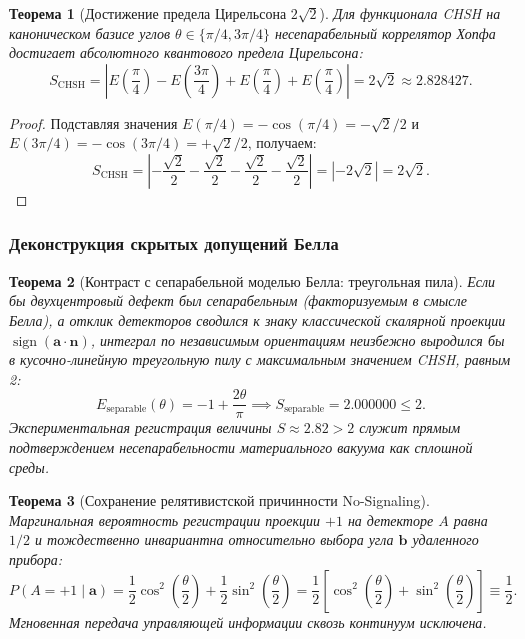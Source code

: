 \documentclass[11pt,a4paper]{article}
\newtheorem{theorem}{Теорема}
\theoremstyle{definition}
\theoremstyle{remark}
\begin{document}
\begin{theorem}[Достижение предела Цирельсона $2\sqrt{2}$]\cite{Tsirelson1980}
\label{thm:tsirelson_bound_exact_proof}
Для функционала CHSH на каноническом базисе углов $\theta \in \{\pi/4, 3\pi/4\}$ несепарабельный коррелятор Хопфа достигает абсолютного квантового предела Цирельсона:
\begin{equation}
S_{\mathrm{CHSH}} = \left| E\left(\frac{\pi}{4}\right) - E\left(\frac{3\pi}{4}\right) + E\left(\frac{\pi}{4}\right) + E\left(\frac{\pi}{4}\right) \right| = 2\sqrt{2} \approx 2.828427.
\label{eq:tsirelson_bound_exact_value}
\end{equation}
\end{theorem}
\begin{proof}
    Подставляя значения $E(\pi/4) = -\cos(\pi/4) = -\sqrt{2}/2$ и $E(3\pi/4) = -\cos(3\pi/4) = +\sqrt{2}/2$, получаем:
\begin{equation}
     S_{\mathrm{CHSH}} = \left| -\frac{\sqrt{2}}{2} - \frac{\sqrt{2}}{2} - \frac{\sqrt{2}}{2} - \frac{\sqrt{2}}{2} \right| = |-2\sqrt{2}| = 2\sqrt{2}.
\end{equation}
\end{proof}

\subsubsection{Деконструкция скрытых допущений Белла}

\begin{theorem}[Контраст с сепарабельной моделью Белла: треугольная пила]
\label{thm:classical_bell_comparison}
    Если бы двухцентровый дефект был сепарабельным (факторизуемым в смысле Белла), а отклик детекторов сводился к знаку классической скалярной проекции $\operatorname{sign}(\mathbf{a} \cdot \mathbf{n})$, интеграл по независимым ориентациям неизбежно выродился бы в кусочно-линейную треугольную пилу с максимальным значением CHSH, равным 2:
\begin{equation}
    E_{\mathrm{separable}}(\theta) = -1 + \frac{2\theta}{\pi} \implies S_{\mathrm{separable}} = 2.000000 \le 2.
    \label{eq:bell_classical_sawtooth}
\end{equation}
    Экспериментальная регистрация величины $S \approx 2.82 > 2$ служит прямым подтверждением несепарабельности материального вакуума как сплошной среды.
\end{theorem}

\begin{theorem}[Сохранение релятивистской причинности No-Signaling]
    \label{thm:no_signaling_exact_proof}
    Маргинальная вероятность регистрации проекции $+1$ на детекторе $A$ равна $1/2$ и тождественно инвариантна относительно выбора угла $\mathbf{b}$ удаленного прибора:
\begin{equation}
    P(A = +1 \mid \mathbf{a}) = \frac{1}{2}\cos^2\left(\frac{\theta}{2}\right) + \frac{1}{2}\sin^2\left(\frac{\theta}{2}\right) = \frac{1}{2}\left[\cos^2\left(\frac{\theta}{2}\right) + \sin^2\left(\frac{\theta}{2}\right)\right] \equiv \frac{1}{2}.
    \label{eq:no_signaling_exact_half}
\end{equation}
    Мгновенная передача управляющей информации сквозь континуум исключена.
\end{theorem}
\end{document}
